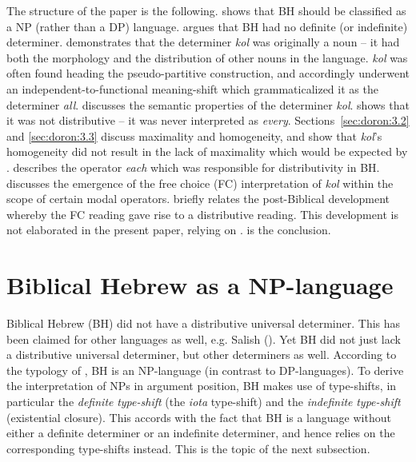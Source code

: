 \documentclass[output=paper]{langsci/langscibook}
\begin{document}
The structure of the paper is the following.  shows that BH should be classified as a NP (rather than a DP) language.  argues that BH had no definite (or indefinite) determiner.  demonstrates that the determiner \textit{kol} was originally a noun – it had both the morphology and the distribution of other nouns in the language. \textit{kol} was often found heading the pseudo-partitive construction, and accordingly underwent an independent-to-functional meaning-shift which grammaticalized it as the determiner \textit{all}.  discusses the semantic properties of the determiner \textit{kol}.  shows that it was not distributive – it was never interpreted as \textit{every}. Sections~\ref{sec:doron:3.2} and \ref{sec:doron:3.3} discuss maximality and homogeneity, and show that \textit{kol}’s homogeneity did not result in the lack of maximality which would be expected by \citet{Križ2016}.  describes the operator \textit{each} which was responsible for distributivity in BH.  discusses the emergence of the free choice (FC) interpretation of \textit{kol} within the scope of certain modal operators.  briefly relates the post-Biblical development whereby the FC reading gave rise to a distributive reading. This development is not elaborated in the present paper, relying on \citet{Beck2017}.  is the conclusion.

\section{Biblical Hebrew as a NP-language}\label{sec:doron:2}%
Biblical Hebrew (BH) did not have a distributive universal determiner. This has been claimed for other languages as well, e.g. Salish (\citealt{Jelinek1993,Davis2010,DavisEtAl2014,FintelMatthewson2008,Matthewson2001, Matthewson2014}). Yet BH did not just lack a distributive universal determiner, but other determiners as well. According to the typology of \citet{Bošković2008}, BH is an NP-language (in contrast to DP-languages). To derive the interpretation of NPs in argument position, BH makes use of type-shifts, in particular the \textit{definite} \textit{type-shift} (the \textit{iota} type-shift) and the \textit{indefinite} \textit{type-shift} (existential closure). This accords with the fact that BH is a language without either a definite determiner or an indefinite determiner, and hence relies on the corresponding type-shifts instead. This is the topic of the next subsection.
\end{document}
